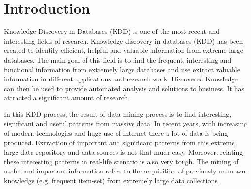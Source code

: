 \documentclass[conference]{IEEEtran}
\begin{document}




%
\IEEEpeerreviewmaketitle


\section{Introduction}

Knowledge Discovery in Databases (KDD) is one of the most recent and interesting fields of research. Knowledge discovery in databases (KDD) has been created to identify efficient, helpful and valuable information from extreme large databases. The main goal of this field is to find the frequent, interesting and functional information from extremely large databases and use extract valuable information in different applications and research work. Discovered Knowledge can then be used to provide automated analysis and solutions to business. It has attracted a significant amount of research.

In this KDD process, the result of data mining process is to find interesting, significant and useful patterns from massive data. In recent years, with increasing of modern technologies and huge use of internet there a lot of data is being produced. Extraction of important and significant patterns from this extreme large data repository and data sources is not that much easy. Moreover. relating these interesting patterns in real-life scenario is also very tough. The mining of useful and important information refers to the acquisition of previously unknown knowledge (e.g. frequent item-set) from extremely large data collections.
\end{document}
